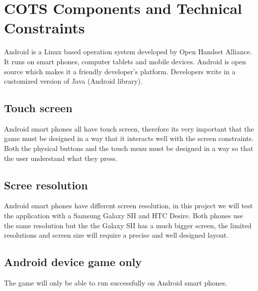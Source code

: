 \section{COTS Components and Technical Constraints}
Android \cite{Android} is a Linux based operation system developed by Open Handset Alliance. It runs on smart phones, computer tablets and mobile devices. Android is open source which makes it a friendly developer's platform. Developers write in a customized version of Java (Android library).


\subsection{Touch screen}
Android smart phones all have touch screen, therefore its very important that the game must be designed in a way that it interacts well with the screen constraints. Both the physical buttons and the touch menu must be designed in a way so that the user understand what they press.

\subsection{Scree resolution}
Android smart phones have different screen resolution, in this project we will test the application with a Samsung Galaxy SII and HTC Desire. Both phones use the same resolution but the the Galaxy SII has a much bigger screen, the limited resolutions and screen size will require a precise and well designed layout.

\subsection{Android device game only}
The game will only be able to run successfully on Android smart phones.


